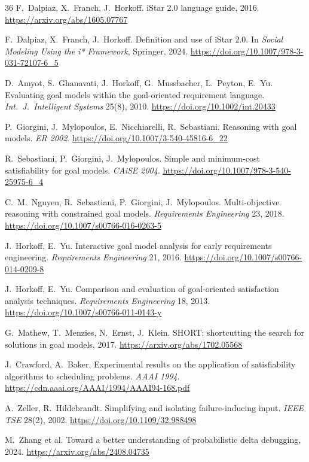 \documentclass[sigconf,nonacm]{acmart}
\begin{document}
\begin{thebibliography}{36}
 F.~Dalpiaz, X.~Franch, J.~Horkoff. iStar
2.0 language guide, 2016.
\url{https://arxiv.org/abs/1605.07767}

 F.~Dalpiaz, X.~Franch, J.~Horkoff.
Definition and use of iStar 2.0. In \emph{Social Modeling
Using the i* Framework}, Springer, 2024.
\url{https://doi.org/10.1007/978-3-031-72107-6_5}

 D.~Amyot, S.~Ghanavati, J.~Horkoff,
G.~Mussbacher, L.~Peyton, E.~Yu. Evaluating goal models within
the goal-oriented requirement language. \emph{Int.\ J.\
Intelligent Systems} 25(8), 2010.
\url{https://doi.org/10.1002/int.20433}

 P.~Giorgini, J.~Mylopoulos,
E.~Nicchiarelli, R.~Sebastiani. Reasoning with goal models.
\emph{ER 2002}.
\url{https://doi.org/10.1007/3-540-45816-6_22}

 R.~Sebastiani, P.~Giorgini,
J.~Mylopoulos. Simple and minimum-cost satisfiability for goal
models. \emph{CAiSE 2004}.
\url{https://doi.org/10.1007/978-3-540-25975-6_4}

 C.~M.~Nguyen, R.~Sebastiani, P.~Giorgini,
J.~Mylopoulos. Multi-objective reasoning with constrained goal
models. \emph{Requirements Engineering} 23, 2018.
\url{https://doi.org/10.1007/s00766-016-0263-5}

 J.~Horkoff, E.~Yu. Interactive goal model
analysis for early requirements engineering.
\emph{Requirements Engineering} 21, 2016.
\url{https://doi.org/10.1007/s00766-014-0209-8}

 J.~Horkoff, E.~Yu. Comparison and
evaluation of goal-oriented satisfaction analysis techniques.
\emph{Requirements Engineering} 18, 2013.
\url{https://doi.org/10.1007/s00766-011-0143-y}

 G.~Mathew, T.~Menzies, N.~Ernst, J.~Klein.
SHORT: shortcutting the search for solutions in goal models,
2017. \url{https://arxiv.org/abs/1702.05568}

 J.~Crawford, A.~Baker. Experimental
results on the application of satisfiability algorithms to
scheduling problems. \emph{AAAI 1994}.
\url{https://cdn.aaai.org/AAAI/1994/AAAI94-168.pdf}

 A.~Zeller, R.~Hildebrandt. Simplifying and
isolating failure-inducing input. \emph{IEEE TSE} 28(2), 2002.
\url{https://doi.org/10.1109/32.988498}

 M.~Zhang et al. Toward a better
understanding of probabilistic delta debugging, 2024.
\url{https://arxiv.org/abs/2408.04735}


\end{thebibliography}
\end{document}
